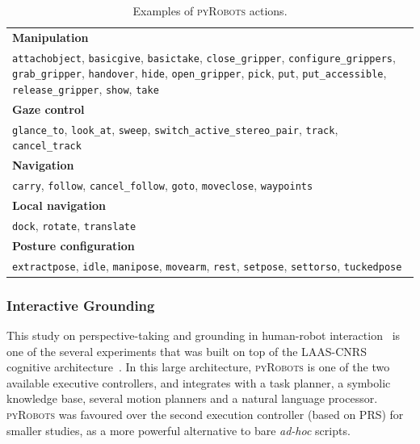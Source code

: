 \documentclass[a4paper, 10pt, conference]{ieeeconf}      %
\newcommand{\pyRobots}{\textsc{pyRobots}}
\begin{document}
\begin{table}[ht!]
\begin{center}
\begin{tabular}{p{}}
    \toprule
    {\bf Manipulation} \\
     {\tt attachobject}, {\tt basicgive}, {\tt basictake}, {\tt close\_gripper}, {\tt configure\_grippers}, {\tt grab\_gripper}, {\tt handover}, {\tt hide}, {\tt open\_gripper}, {\tt pick}, {\tt put}, {\tt put\_accessible}, {\tt release\_gripper}, {\tt show}, {\tt take} \\
     \midrule
    {\bf Gaze control} \\
     {\tt glance\_to}, {\tt look\_at}, {\tt sweep}, {\tt switch\_active\_stereo\_pair}, {\tt track}, {\tt cancel\_track} \\
     \midrule
    {\bf Navigation} \\
     {\tt carry}, {\tt follow}, {\tt cancel\_follow}, {\tt goto}, {\tt moveclose}, {\tt waypoints} \\
     \midrule
    {\bf Local navigation} \\
     {\tt dock}, {\tt rotate}, {\tt translate} \\
     \midrule
    {\bf Posture configuration} \\
     {\tt extractpose}, {\tt idle}, {\tt manipose}, {\tt movearm}, {\tt rest}, {\tt setpose}, {\tt settorso}, {\tt tuckedpose} \\
     \bottomrule
\end{tabular}
\end{center}
\caption{Examples of \pyRobots{} actions.}

\label{pyrobots_actions}
\end{table}

\subsubsection{Interactive Grounding} This study on perspective-taking and grounding
in human-robot interaction~\cite{lemaignan2013talking} is one of the several
experiments that was built on top of the LAAS-CNRS cognitive
architecture~\cite{lemaignan2014human}. In this large architecture, \pyRobots{}
is one of the two available executive controllers, and integrates with a task
planner, a symbolic knowledge base, several motion planners and a natural
language processor. \pyRobots{} was favoured over the second execution
controller (based on PRS) for smaller studies, as a more powerful alternative to
bare \textit{ad-hoc} scripts.
\end{document}
